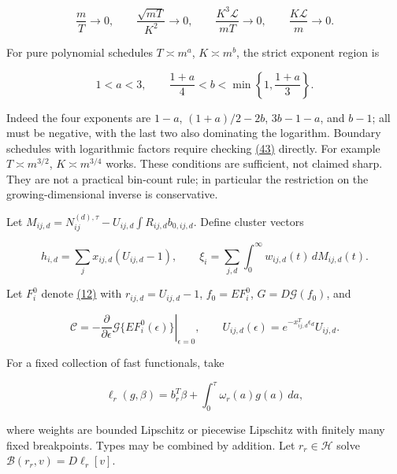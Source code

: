 \documentclass[11pt]{article}
\begin{document}
\begin{equation*}
\frac mT\longrightarrow0,\qquad
\frac{\sqrt{mT}}{K^2}\longrightarrow0,\qquad
\frac{K^3\mathscr L}{mT}\longrightarrow0,\qquad
\frac{K\mathscr L}{m}\longrightarrow0 .
\tag{43}\label{eq:43}
\end{equation*}

For pure polynomial schedules \(T\asymp m^a\), \(K\asymp m^b\), the strict exponent region is

\begin{equation*}
1<a<3,\qquad \frac{1+a}{4}<b<\min\left\{1,\frac{1+a}{3}\right\}.
\tag{44}\label{eq:44}
\end{equation*}

Indeed the four exponents are \(1-a\), \((1+a)/2-2b\), \(3b-1-a\), and \(b-1\); all must be negative, with the last two also dominating the logarithm. Boundary schedules with logarithmic factors require checking \hyperref[eq:43]{(43)} directly. For example \(T\asymp m^{3/2}\), \(K\asymp m^{3/4}\) works. These conditions are sufficient, not claimed sharp. They are not a practical bin-count rule; in particular the restriction on the growing-dimensional inverse is conservative.

Let \(M_{ij,d}=N_{ij}^{(d),\tau}-U_{ij,d}\int R_{ij,d}b_{0,ij,d}\). Define cluster vectors

\begin{equation*}
h_{i,d}=\sum_jx_{ij,d}(U_{ij,d}-1),\qquad
\xi_i=\sum_{j,d}\int_0^\infty w_{ij,d}(t)\,dM_{ij,d}(t).
\tag{45}\label{eq:45}
\end{equation*}

Let \(F_i^0\) denote \hyperref[eq:12]{(12)} with \(r_{ij,d}=U_{ij,d}-1\),
\(f_0=EF_i^0\), \(G=D\mathcal G(f_0)\), and

\begin{equation*}
\mathcal C=-\left.\frac{\partial}{\partial\epsilon}
 \mathcal G\{EF_i^0(\epsilon)\}\right|_{\epsilon=0},
\qquad U_{ij,d}(\epsilon)=e^{-x_{ij,d}^T\epsilon_d}U_{ij,d}.
\tag{46}\label{eq:46}
\end{equation*}

For a fixed collection of fast functionals, take

\begin{equation*}
\ell_r(g,\beta)=b_r^T\beta+\int_0^\tau \omega_r(a)g(a)\,da,
\tag{47}\label{eq:47}
\end{equation*}

where weights are bounded Lipschitz or piecewise Lipschitz with finitely many fixed breakpoints. Types may be combined by addition. Let \(r_r\in\mathcal H\) solve
\(\mathcal B(r_r,v)=D\ell_r[v]\).
\end{document}
